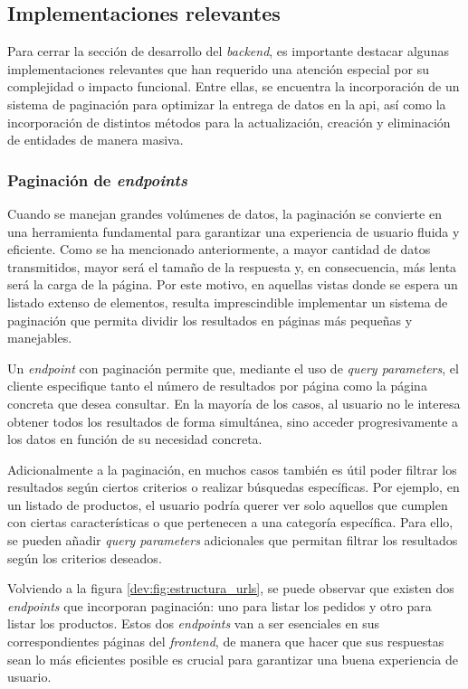 \subsection{Implementaciones relevantes}
\label{dev:subsec:implementaciones_relevantes}

Para cerrar la sección de desarrollo del \textit{backend}, es importante destacar algunas implementaciones relevantes que han requerido una atención especial por su complejidad o impacto funcional. Entre ellas, se encuentra la incorporación de un sistema de paginación para optimizar la entrega de datos en la \gls{api}, así como la incorporación de distintos métodos para la actualización, creación y eliminación de entidades de manera masiva.

\subsubsection{Paginación de \textit{endpoints}}
\label{dev:subsubsec:paginacion_endpoints}

Cuando se manejan grandes volúmenes de datos, la paginación se convierte en una herramienta fundamental para garantizar una experiencia de usuario fluida y eficiente. Como se ha mencionado anteriormente, a mayor cantidad de datos transmitidos, mayor será el tamaño de la respuesta y, en consecuencia, más lenta será la carga de la página. Por este motivo, en aquellas vistas donde se espera un listado extenso de elementos, resulta imprescindible implementar un sistema de paginación que permita dividir los resultados en páginas más pequeñas y manejables.

Un \textit{endpoint} con paginación permite que, mediante el uso de \textit{query parameters}, el cliente especifique tanto el número de resultados por página como la página concreta que desea consultar. En la mayoría de los casos, al usuario no le interesa obtener todos los resultados de forma simultánea, sino acceder progresivamente a los datos en función de su necesidad concreta.

Adicionalmente a la paginación, en muchos casos también es útil poder filtrar los resultados según ciertos criterios o realizar búsquedas específicas. Por ejemplo, en un listado de productos, el usuario podría querer ver solo aquellos que cumplen con ciertas características o que pertenecen a una categoría específica. Para ello, se pueden añadir \textit{query parameters} adicionales que permitan filtrar los resultados según los criterios deseados.

Volviendo a la figura \ref{dev:fig:estructura_urls}, se puede observar que existen dos \textit{endpoints} que incorporan paginación: uno para listar los pedidos y otro para listar los productos. Estos dos \textit{endpoints} van a ser esenciales en sus correspondientes páginas del \textit{frontend}, de manera que hacer que sus respuestas sean lo más eficientes posible es crucial para garantizar una buena experiencia de usuario.

